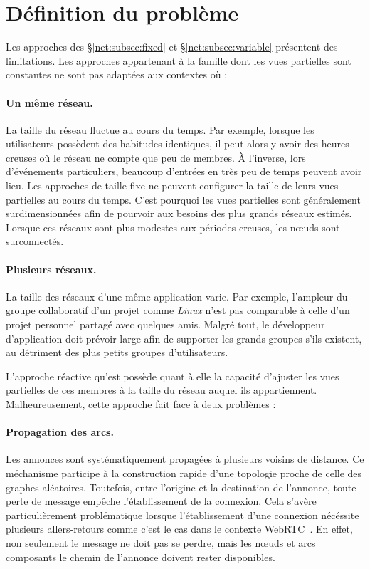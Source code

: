 
\section{Définition du problème}
\label{net:sec:motivations}

Les approches des §\ref{net:subsec:fixed} et §\ref{net:subsec:variable} présentent des
limitations. Les approches appartenant à la famille dont les vues partielles
sont constantes ne sont pas adaptées aux contextes où :

\paragraph{Un même réseau.} La taille du réseau fluctue au cours du temps. Par
exemple, lorsque les utilisateurs possèdent des habitudes identiques, il peut
alors y avoir des heures creuses où le réseau ne compte que peu de membres. À
l'inverse, lors d'événements particuliers, beaucoup d'entrées en très peu de
temps peuvent avoir lieu.  Les approches de taille fixe ne peuvent configurer la
taille de leurs vues partielles au cours du temps. C'est pourquoi les vues
partielles sont généralement surdimensionnées afin de pourvoir aux besoins des
plus grands réseaux estimés. Lorsque ces réseaux sont plus modestes aux périodes
creuses, les nœuds sont surconnectés.

\paragraph{Plusieurs réseaux.} La taille des réseaux d'une même application
varie. Par exemple, l'ampleur du groupe collaboratif d'un projet comme
\emph{Linux} n'est pas comparable à celle d'un projet personnel partagé avec
quelques amis. Malgré tout, le développeur d'application doit prévoir large afin
de supporter les grands groupes s'ils existent, au détriment des plus petits
groupes d'utilisateurs.



L'approche réactive qu'est \SCAMP possède quant à elle la capacité d'ajuster les
vues partielles de ces membres à la taille du réseau auquel ils
appartiennent. Malheureusement, cette approche fait face à deux problèmes :

\paragraph{Propagation des arcs.} Les annonces sont systématiquement propagées à
plusieurs voisins de distance. Ce méchanisme participe à la construction rapide
d'une topologie proche de celle des graphes aléatoires. Toutefois, entre
l'origine et la destination de l'annonce, toute perte de message empêche
l'établissement de la connexion. Cela s'avère particulièrement problématique
lorsque l'établissement d'une connexion nécéssite plusieurs allers-retours comme
c'est le cas dans le contexte WebRTC~\cite{webrtc}. En effet, non seulement le
message ne doit pas se perdre, mais les nœuds et arcs composants le chemin de
l'annonce doivent rester disponibles.

